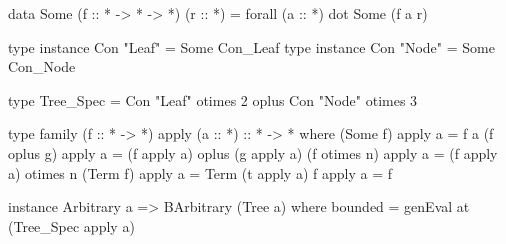 \begin{code}
data Some (f :: * -> * -> *) (r :: *) = forall (a :: *) dot Some (f a r)
\end{code}


\begin{code}
type instance Con "Leaf" = Some Con_Leaf
type instance Con "Node" = Some Con_Node
\end{code}


\begin{code}
type Tree_Spec
  =      Con "Leaf" otimes 2
  oplus  Con "Node" otimes 3
\end{code}


\begin{code}
type family (f :: * -> *) apply (a :: *) :: * -> *  where
  (Some f)      apply  a  = f a
  (f oplus g)   apply  a  = (f apply a) oplus (g apply a)
  (f otimes n)  apply  a  = (f apply a) otimes n
  (Term f)      apply  a  = Term (t apply a)
  f             apply  a  = f
\end{code}

\begin{code}
instance Arbitrary a => BArbitrary (Tree a) where
  bounded = genEval at (Tree_Spec apply a)
\end{code}
